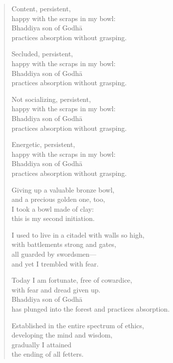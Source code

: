 \documentclass[12pt,openany]{book}%
\begin{document}
\begin{verse}
Content, persistent, \\
happy with the scraps in my bowl: \\
Bhaddiya son of \textsanskrit{Godhā} \\
practices absorption without grasping. 

Secluded, persistent, \\
happy with the scraps in my bowl: \\
Bhaddiya son of \textsanskrit{Godhā} \\
practices absorption without grasping. 

Not socializing, persistent, \\
happy with the scraps in my bowl: \\
Bhaddiya son of \textsanskrit{Godhā} \\
practices absorption without grasping. 

Energetic, persistent, \\
happy with the scraps in my bowl: \\
Bhaddiya son of \textsanskrit{Godhā} \\
practices absorption without grasping. 

Giving up a valuable bronze bowl, \\
and a precious golden one, too, \\
I took a bowl made of clay: \\
this is my second initiation. 

I used to live in a citadel with walls so high, \\
with battlements strong and gates, \\
all guarded by swordsmen—\\
and yet I trembled with fear. 

Today I am fortunate, free of cowardice, \\
with fear and dread given up. \\
Bhaddiya son of \textsanskrit{Godhā} \\
has plunged into the forest and practices absorption. 

Established in the entire spectrum of ethics, \\
developing the mind and wisdom, \\
gradually I attained \\
the ending of all fetters. 

%
\end{verse}
\end{document}
